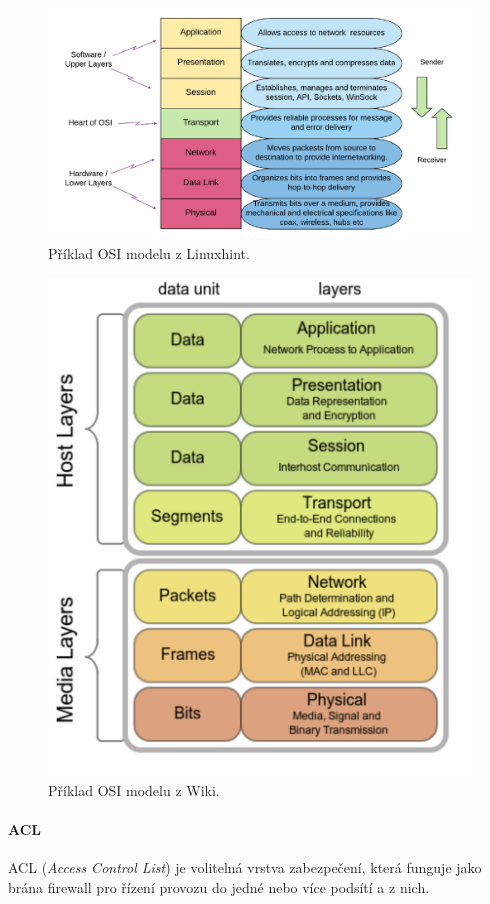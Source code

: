 \begin{figure}[H]
    \centering
    \includegraphics[width=1\linewidth]{osi_model_linuxhint.pdf}
    \caption{Příklad OSI modelu z Linuxhint.}
\end{figure}

\begin{figure}[H]
    \centering
    \includegraphics[width=0.65\linewidth]{osi_model_wiki.pdf}
    \caption{Příklad OSI modelu z Wiki.}
\end{figure}

\paragraph*{ACL} ACL (\textit{Access Control List}) je volitelná vrstva zabezpečení, která funguje jako brána firewall pro řízení provozu do jedné nebo více podsítí a z nich.

